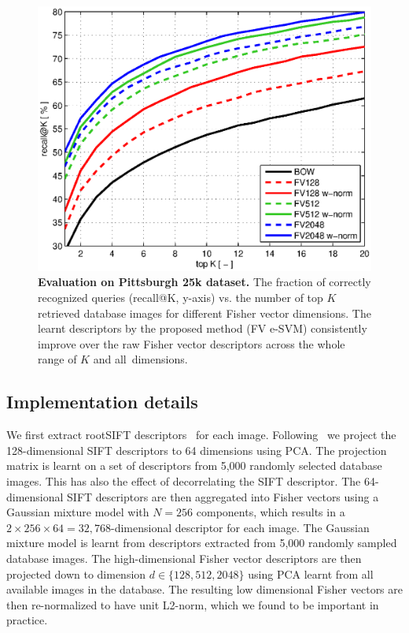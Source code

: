 \documentclass[10pt,twocolumn,letterpaper]{article}
\begin{document}
      \begin{figure}[t!]
         \centering
         \includegraphics[trim = 7mm 0mm 12mm 6mm, clip=true, width=1.0\linewidth]{imgs/plotPitt25kSURF}    
         \caption{
            \textbf{Evaluation on Pittsburgh 25k \cite{Gronat13} dataset.} The fraction of correctly recognized queries (recall@K, y-axis) vs. the number of top $K$ retrieved database images for different Fisher vector dimensions. The learnt descriptors by the proposed method (FV e-SVM) consistently improve over the raw Fisher vector descriptors across the whole range of $K$ and all~dimensions.
         }
         \label{fig:recall}
      \end{figure}

   \subsection{Implementation details}
      We first extract rootSIFT descriptors~\cite{Arandjelovic12} for each image. Following~\cite{Jegou12} we project the 128-dimensional SIFT descriptors to 64 dimensions using PCA. The projection matrix is learnt on a set of descriptors from 5,000 randomly selected database images. This has also the effect of decorrelating the SIFT descriptor. 
      The 64-dimensional SIFT descriptors are then aggregated into Fisher vectors using a Gaussian mixture model with $N=256$ components, which  results in a $2\times256\times64 = 32,768$-dimensional descriptor for each image. The Gaussian mixture model is learnt from descriptors extracted from 5,000 randomly sampled database images. 
      The  high-dimensional Fisher vector descriptors are then projected down to dimension $d\in\{128,512, 2048\}$ using PCA learnt from all available images in the database. 
      The resulting low dimensional Fisher vectors are then re-normalized to have unit L2-norm, which we found to be important in practice. 
\end{document}
